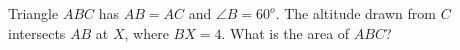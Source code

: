 Triangle $ABC$ has $AB = AC$ and $\angle B = 60^o$. The altitude drawn from $C$ intersects $AB$ at $X$, where $BX = 4$. What is the area of $ABC$?
